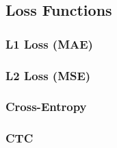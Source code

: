 \subsection{Loss Functions}
\subsubsection{L1 Loss (MAE)}
\subsubsection{L2 Loss (MSE)}
\subsubsection{Cross-Entropy}
\subsubsection{CTC}